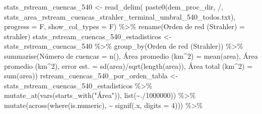 \documentclass[spanish]{article}
\newenvironment{Shaded}{\begin{snugshade}}{\end{snugshade}}
\newcommand{\AttributeTok}[1]{\textcolor[rgb]{0.77,0.63,0.00}{#1}}
\newcommand{\DecValTok}[1]{\textcolor[rgb]{0.00,0.00,0.81}{#1}}
\newcommand{\FunctionTok}[1]{\textcolor[rgb]{0.00,0.00,0.00}{#1}}
\newcommand{\NormalTok}[1]{#1}
\newcommand{\OtherTok}[1]{\textcolor[rgb]{0.56,0.35,0.01}{#1}}
\newcommand{\SpecialCharTok}[1]{\textcolor[rgb]{0.00,0.00,0.00}{#1}}
\newcommand{\StringTok}[1]{\textcolor[rgb]{0.31,0.60,0.02}{#1}}
\begin{document}
\begin{Shaded}
\begin{Highlighting}[]
\NormalTok{stats\_rstream\_cuencas\_540 }\OtherTok{\textless{}{-}} \FunctionTok{read\_delim}\NormalTok{(}
  \FunctionTok{paste0}\NormalTok{(dem\_proc\_dir, }\StringTok{\textquotesingle{}/\textquotesingle{}}\NormalTok{,}
         \StringTok{\textquotesingle{}stats\_area\_rstream\_cuencas\_strahler\_terminal\_umbral\_540\_todos.txt\textquotesingle{}}\NormalTok{),}
  \AttributeTok{progress =}\NormalTok{ F, }\AttributeTok{show\_col\_types =}\NormalTok{ F) }\SpecialCharTok{\%\textgreater{}\%} 
  \FunctionTok{rename}\NormalTok{(}\StringTok{\textasciigrave{}}\AttributeTok{Orden de red (Strahler)}\StringTok{\textasciigrave{}} \OtherTok{=}\NormalTok{ strahler)}
\NormalTok{stats\_rstream\_cuencas\_540\_estadisticos }\OtherTok{\textless{}{-}}\NormalTok{ stats\_rstream\_cuencas\_540 }\SpecialCharTok{\%\textgreater{}\%} 
  \FunctionTok{group\_by}\NormalTok{(}\StringTok{\textasciigrave{}}\AttributeTok{Orden de red (Strahler)}\StringTok{\textasciigrave{}}\NormalTok{)  }\SpecialCharTok{\%\textgreater{}\%}
  \FunctionTok{summarise}\NormalTok{(}\StringTok{\textasciigrave{}}\AttributeTok{Número de cuencas}\StringTok{\textasciigrave{}} \OtherTok{=} \FunctionTok{n}\NormalTok{(),}
            \StringTok{\textasciigrave{}}\AttributeTok{Área promedio (km$\^{}2$)}\StringTok{\textasciigrave{}} \OtherTok{=} \FunctionTok{mean}\NormalTok{(area),}
            \StringTok{\textasciigrave{}}\AttributeTok{Área promedio (km$\^{}2$), error est.}\StringTok{\textasciigrave{}} \OtherTok{=} \FunctionTok{sd}\NormalTok{(area)}\SpecialCharTok{/}\FunctionTok{sqrt}\NormalTok{(}\FunctionTok{length}\NormalTok{(area)),}
            \StringTok{\textasciigrave{}}\AttributeTok{Área total (km$\^{}2$)}\StringTok{\textasciigrave{}} \OtherTok{=} \FunctionTok{sum}\NormalTok{(area))}
\NormalTok{rstream\_cuencas\_540\_por\_orden\_tabla }\OtherTok{\textless{}{-}}\NormalTok{ stats\_rstream\_cuencas\_540\_estadisticos  }\SpecialCharTok{\%\textgreater{}\%}
  \FunctionTok{mutate\_at}\NormalTok{(}\FunctionTok{vars}\NormalTok{(}\FunctionTok{starts\_with}\NormalTok{(}\StringTok{"Área"}\NormalTok{)), }\FunctionTok{list}\NormalTok{(}\SpecialCharTok{\textasciitilde{}}\NormalTok{.}\SpecialCharTok{/}\DecValTok{1000000}\NormalTok{)) }\SpecialCharTok{\%\textgreater{}\%}
  \FunctionTok{mutate}\NormalTok{(}\FunctionTok{across}\NormalTok{(}\FunctionTok{where}\NormalTok{(is.numeric), }\SpecialCharTok{\textasciitilde{}} \FunctionTok{signif}\NormalTok{(.x, }\AttributeTok{digits =} \DecValTok{4}\NormalTok{))) }\SpecialCharTok{\%\textgreater{}\%} 

\end{Highlighting}
\end{Shaded}
\end{document}
